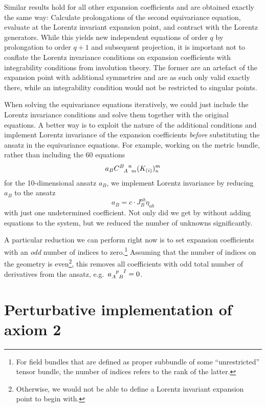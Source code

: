 Similar results hold for all other expansion coefficients and are obtained exactly the same way: Calculate prolongations of the second equivariance equation, evaluate at the Lorentz invariant expansion point, and contract with the Lorentz generators. While this yields new independent equations of order $q$ by prolongation to order $q+1$ and subsequent projection, it is important not to conflate the Lorentz invariance conditions on expansion coefficients with integrability conditions from involution theory. The former are an artefact of the expansion point with additional symmetries and are as such only valid exactly there, while an integrability condition would not be restricted to singular points.

When solving the equivariance equations iteratively, we could just include the Lorentz invariance conditions and solve them together with the original equations. A better way is to exploit the nature of the additional conditions and implement Lorentz invariance of the expansion coefficients \emph{before} substituting the ansatz in the equivariance equations. For example, working on the metric bundle, rather than including the 60 equations
\begin{equation}
  a_B \gmc{B}{A}{n}{m}(K_{(i)})^m_n
\end{equation}
for the 10-dimensional ansatz $a_B$, we implement Lorentz invariance by reducing $a_B$ to the ansatz
\begin{equation}
  a_B = c\cdot J_B^{ab} \eta_{ab}
\end{equation}
with just one undetermined coefficient. Not only did we get by without adding equations to the system, but we reduced the number of unknowns significantly.

A particular reduction we can perform right now is to set expansion coefficients with an \emph{odd} number of indices to zero.\footnote{For field bundles that are defined as proper subbundle of some ``unrestricted'' tensor bundle, the number of indices refers to the rank of the latter.} Assuming that the number of indices on the geometry is even\footnote{Otherwise, we would not be able to define a Lorentz invariant expansion point to begin with.}, this removes all coefficients with odd total number of derivatives from the ansatz, e.g.~$a_{A\hphantom pB}^{\hphantom Ap\hphantom BI}=0$.

\section{Perturbative implementation of axiom 2}

